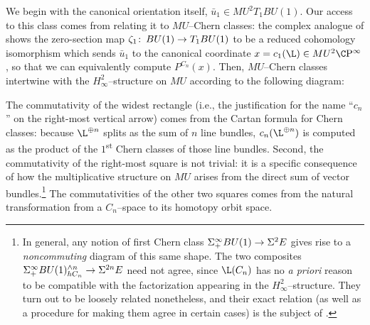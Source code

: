 We begin with the canonical orientation itself, \(\bar u_1 \in MU^2 T_1 BU(1)\).  Our access to this class comes from relating it to \(MU\)--Chern classes: the complex analogue of  shows the zero-section map \(\zeta_1\colon\thinspace BU(1) \to T_1 BU(1)\) to be a reduced cohomology isomorphism which sends \(\bar u_1\) to the canonical coordinate \(x = c_1(\L) \in MU^2 \CP^\infty\), so that we can equivalently compute \(P^{C_n}(x)\).  Then, \(MU\)--Chern classes intertwine with the \(H_\infty^2\)--structure on \(MU\) according to the following diagram:
\begin{center}
\end{center}
The commutativity of the widest rectangle (i.e., the justification for the name ``\(c_n\)'' on the right-most vertical arrow) comes from the Cartan formula for Chern classes: because \(\L^{\oplus n}\) splits as the sum of \(n\) line bundles, \(c_n(\L^{\oplus n})\) is computed as the product of the \(1\)\textsuperscript{st} Chern classes of those line bundles.  Second, the commutativity of the right-most square is not trivial: it is a specific consequence of how the multiplicative structure on \(MU\) arises from the direct sum of vector bundles.\footnote{In general, any notion of first Chern class \(\Sigma^\infty_+ BU(1) \to \Sigma^2 E\) gives rise to a \emph{noncommuting} diagram of this same shape.  The two composites \(\Sigma^\infty_+ BU(1)^{\wedge n}_{hC_n} \to \Sigma^{2n} E\) need not agree, since \(\L(C_n)\) has no \textit{a priori} reason to be compatible with the factorization appearing in the \(H_\infty^2\)--structure.  They turn out to be loosely related nonetheless, and their exact relation (as well as a procedure for making them agree in certain cases) is the subject of .}  The commutativities of the other two squares comes from the natural transformation from a \(C_n\)--space to its homotopy orbit space.

